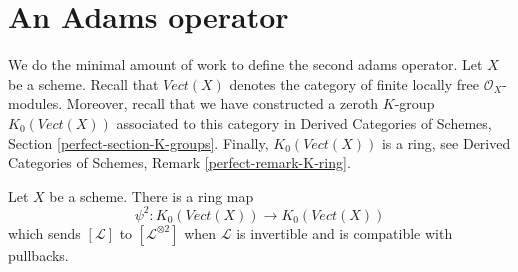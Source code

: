 \section{An Adams operator}
\label{section-adams}

\noindent
We do the minimal amount of work to define the second adams operator.
Let $X$ be a scheme. Recall that $\textit{Vect}(X)$ denotes the
category of finite locally free $\mathcal{O}_X$-modules.
Moreover, recall that we have constructed a zeroth $K$-group
$K_0(\textit{Vect}(X))$ associated to this category in
Derived Categories of Schemes, Section \ref{perfect-section-K-groups}.
Finally, $K_0(\textit{Vect}(X))$ is a ring, see
Derived Categories of Schemes, Remark \ref{perfect-remark-K-ring}.

\begin{lemma}
\label{lemma-second-adams-operator}
Let $X$ be a scheme. There is a ring map
$$
\psi^2 :
K_0(\textit{Vect}(X))
\longrightarrow
K_0(\textit{Vect}(X))
$$
which sends $[\mathcal{L}]$ to $[\mathcal{L}^{\otimes 2}]$
when $\mathcal{L}$ is invertible and is compatible with pullbacks.
\end{lemma}

